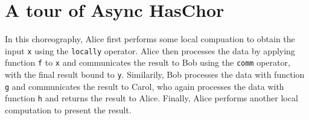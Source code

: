 \section{A tour of Async HasChor}
\label{sec:tour}

\noindent In this choreography, Alice first performs some local compuation to obtain the input \texttt{x} using the \texttt{locally} operator.
%
Alice then processes the data by applying function \texttt{f} to \texttt{x} and communicates the result to Bob using the \texttt{comm} operator, with the final result bound to \texttt{y}.
%
Similarily, Bob processes the data with function \texttt{g} and communicates the result to Carol, who again processes the data with function \texttt{h} and returns the result to Alice.
%
Finally, Alice performs another local computation to present the result.
